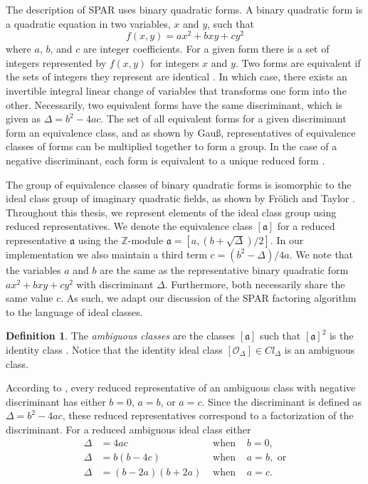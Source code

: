 \documentclass{ucalgthes1}
\theoremstyle{definition}
\newtheorem{defn}[thm]{Definition}
\newcommand{\ZZ}{\mathbb{Z}}
\begin{document}
The description of SPAR uses binary quadratic forms. A binary quadratic form is a quadratic equation in two variables, $x$ and $y$, such that
\[
	f(x, y) = ax^2 + bxy + cy^2
\]
where $a$, $b$, and $c$ are integer coefficients.  For a given form there is a set of integers represented by $f(x, y)$ for integers $x$ and $y$. Two forms are equivalent if the sets of integers they represent are identical \cite[pp.239-240]{Crandall2001}.  In which case, there exists an invertible integral linear change of variables that transforms one form into the other.  Necessarily, two equivalent forms have the same discriminant, which is given as $\Delta = b^2 - 4ac$.  The set of all equivalent forms for a given discriminant form an equivalence class, and as shown by Gau\ss, representatives of equivalence classes of forms can be multiplied together to form a group.  In the case of a negative discriminant, each form is equivalent to a unique reduced form \cite[p.241]{Crandall2001}.  

The group of equivalence classes of binary quadratic forms is isomorphic to the ideal class group of imaginary quadratic fields, as shown by Fr{\"o}lich and Taylor \cite{Frolich1993}.  Throughout this thesis, we represent elements of the ideal class group using reduced representatives.  We denote the equivalence class $[\mathfrak a]$ for a reduced representative $\mathfrak a$ using the $\ZZ$\mbox{-}module $\mathfrak a = [a, (b + \sqrt\Delta)/2]$.  In our  implementation we also maintain a third term $c = (b^2 - \Delta)/4a$.  We note that the variables $a$ and $b$ are the same as the representative binary quadratic form $ax^2 + bxy + cy^2$ with discriminant $\Delta$. Furthermore, both necessarily share the same value $c$.  As such, we adapt our discussion of the SPAR factoring algorithm to the language of ideal classes.

\begin{defn}
The \emph{ambiguous classes} are the classes $[\mathfrak a]$ such that ${[\mathfrak a]}^2$ is the identity class \cite[p.302]{Schnorr1984}.  Notice that the identity ideal class $[\mathcal O_\Delta] \in Cl_\Delta$ is an ambiguous class.
\end{defn}

According to \cite[p.303]{Schnorr1984}, every reduced representative of an ambiguous class with negative discriminant has either $b = 0$, $a = b$, or $a = c$.  Since the discriminant is defined as $\Delta = b^2 - 4ac$, these reduced representatives correspond to a factorization of the discriminant.  For a reduced ambiguous ideal class either
\begin{align*}
	\Delta &= 4ac & \textrm{ when } & b = 0, \\
	\Delta &= b(b-4c) & \textrm{ when } & a = b, \textrm{ or} \\
	\Delta &= (b - 2a)(b + 2a) & \textrm{ when } & a = c.
\end{align*}
\end{document}

